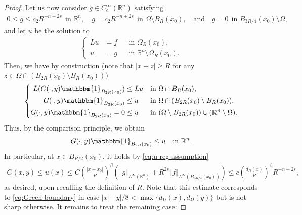 \documentclass[11pt,reqno]{amsart}
\theoremstyle{plain}
\theoremstyle{definition}
\numberwithin{equation}{section}
\newcommand{\R}{\mathbb{R}}
\newcommand{\1}{\mathbbm{1}}
\begin{document}
\begin{proof}
Let us now consider $g \in C_c^{\infty}(\R^n)$ satisfying
\begin{align*}
    0 \le g \le c_2 R^{-n+2s} ~~\text{in } \R^n, \quad g = c_2 R^{-n+2s} ~~ \text{in } \Omega \setminus B_R(x_0), \quad\text{and}\quad g = 0~~ \text{in } B_{3R/4}(x_0) \setminus \Omega,
\end{align*}
and let $u$ be the solution to
\begin{align}\label{eq-Green-u}
\left\{
\begin{aligned}
L u &= f &&\text{in } \Omega_R(x_0),\\
u &= g &&\text{in } \R^n \setminus \Omega_R(x_0).
\end{aligned}
\right.
\end{align}
Then, we have by construction (note that $|x-z| \ge R$ for any $z \in \Omega \cap (B_{2R}(x_0) \setminus B_{R}(x_0))$)
\begin{align*}
\left\{
\begin{aligned}
L(G(\cdot,y)\mathbbm{1}_{B_{2R}(x_0)}) &\le Lu &&\text{in } \Omega \cap B_{R}(x_0),\\
G(\cdot,y)\mathbbm{1}_{B_{2R}(x_0)} &\le u &&\text{in } \Omega \cap (B_{2R}(x_0) \setminus B_{R}(x_0)),\\
G(\cdot,y)\mathbbm{1}_{B_{2R}(x_0)} = 0 &\le u &&\text{in } (\Omega \setminus B_{2R}(x_0)) \cup (\R^n \setminus \Omega).
\end{aligned}
\right.
\end{align*}
Thus, by the comparison principle, we obtain
\begin{align*}
G(\cdot,y)\mathbbm{1}_{B_{2R}(x_0)} \le u ~~ \text{ in } \R^n.
\end{align*}
In particular, at $x \in B_{R/2}(x_0)$, it holds by \eqref{eq:u-reg-assumption}
\begin{align*}
G(x,y) \le u(x) \le C \left( \frac{|x-x_0|}{R} \right)^{\beta} \left( \Vert g \Vert_{L^{\infty}(\R^n)} + R^{2s} \Vert f \Vert_{L^{\infty}(B_{3R/4}(x_0))} \right) \le c \left( \frac{d_{\Omega}(x)}{R} \right)^{\beta} R^{-n+2s},
\end{align*}
as desired, upon recalling the definition of $R$. Note that this estimate corresponds to \eqref{eq:Green-boundary} in case $|x-y|/8 < \max\{ d_{\Omega}(x) , d_{\Omega}(y) \}$ but is not sharp otherwise. It remains to treat the remaining case:


\end{proof}
\end{document}
